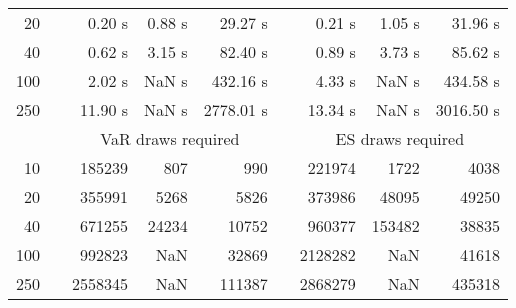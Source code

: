 {{\begin{longtable}{rr rrr r rrr}
20 & & 0.20 s & 0.88 s & 29.27 s && 0.21 s & 1.05 s & 31.96 s \\ 
40 & & 0.62 s & 3.15 s & 82.40 s && 0.89 s & 3.73 s & 85.62 s \\ 
100 & & 2.02 s &  NaN s & 432.16 s && 4.33 s &  NaN s & 434.58 s \\ 
250 & & 11.90 s &  NaN s & 2778.01 s && 13.34 s &  NaN s & 3016.50 s \\ 
\hline 
 && \multicolumn{3}{c}{VaR draws required} &&   \multicolumn{3}{c}{ES draws required} \\  \cline{3-5}  \cline{7-9} 
10 & & 185239 & 807 & 990 && 221974 & 1722 & 4038 \\ 
20 & & 355991 & 5268 & 5826 && 373986 & 48095 & 49250 \\ 
40 & & 671255 & 24234 & 10752 && 960377 & 153482 & 38835 \\ 
100 & & 992823 & NaN & 32869 && 2128282 & NaN & 41618 \\ 
250 & & 2558345 & NaN & 111387 && 2868279 & NaN & 435318 \\ 
\hline 
\end{longtable} 
} 
} 
